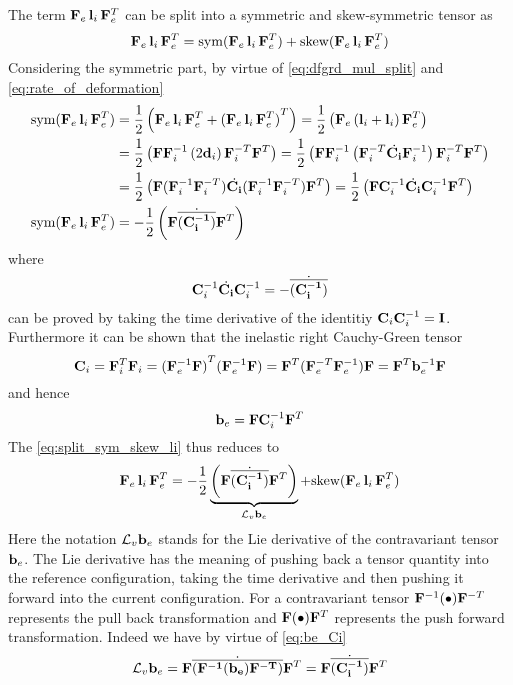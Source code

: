 The term \( \mathbf{F}_{e} \, \mathbf{l}_{i} \, \mathbf{F}_{e}^{T}\) can be split into a symmetric and skew-symmetric tensor as
\begin{equation}
    \mathbf{F}_{e} \, \mathbf{l}_{i} \, \mathbf{F}_{e}^{T} = \text{sym}(\mathbf{F}_{e} \, \mathbf{l}_{i} \, \mathbf{F}_{e}^{T}) + \text{skew}(\mathbf{F}_{e} \, \mathbf{l}_{i} \, \mathbf{F}_{e}^{T})
    \label{eq:split_sym_skew_li}
\end{equation}
Considering the symmetric part, by virtue of \cref{eq:dfgrd_mul_split} and \cref{eq:rate_of_deformation} 
\begin{align}
    \nonumber \text{sym} (\mathbf{F}_{e} \, \mathbf{l}_{i} \, \mathbf{F}_{e}^{T}) 
    &= \frac{1}{2} \left(\mathbf{F}_{e} \, \mathbf{l}_{i} \, \mathbf{F}_{e}^{T} + {(\mathbf{F}_{e} \, \mathbf{l}_{i} \, \mathbf{F}_{e}^{T})}^{T} \right)
    = \frac{1}{2} \left(\mathbf{F}_{e}  \left(\mathbf{l}_{i} + \mathbf{l}_{i}\right)  \mathbf{F}_{e}^{T} \right) \\
    \nonumber &= \frac{1}{2} \left(\mathbf{F} \mathbf{F}_{i}^{-1}  \left(2 \mathbf{d}_{i} \right)  \mathbf{F}_{i}^{-T} \mathbf{F}^{T} \right)
    = \frac{1}{2} \left(\mathbf{F} \mathbf{F}_{i}^{-1}  \left(\mathbf{F}_{i}^{-T} \dot{\mathbf{C}_{i}} \mathbf{F}_{i}^{-1} \right)  \mathbf{F}_{i}^{-T} \mathbf{F}^{T} \right) \\
    \nonumber&=  \frac{1}{2} \left(\mathbf{F} (\mathbf{F}_{i}^{-1}  \mathbf{F}_{i}^{-T}) \dot{\mathbf{C}_{i}} (\mathbf{F}_{i}^{-1} \mathbf{F}_{i}^{-T}) \mathbf{F}^{T} \right)= \frac{1}{2} \left(\mathbf{F} \mathbf{C}_{i}^{-1} \dot{\mathbf{C}_{i}} \mathbf{C}_{i}^{-1} \mathbf{F}^{T} \right)  \\
    \text{sym} (\mathbf{F}_{e} \, \mathbf{l}_{i} \, \mathbf{F}_{e}^{T}) 
    & = -\frac{1}{2} \left(\mathbf{F} \dot{\overline{(\mathbf{C}_{i}^{-1})}} \mathbf{F}^{T} \right)
\end{align}
where 
\begin{equation}
    \mathbf{C}_{i}^{-1} \dot{\mathbf{C}_{i}} \mathbf{C}_{i}^{-1} = - \dot{\overline{(\mathbf{C}_{i}^{-1})}}
\end{equation}
can be proved by taking the time derivative of the identitiy \(\mathbf{C}_{i} \mathbf{C}_{i}^{-1} = \mathbf{I}\). Furthermore it can be shown that the inelastic right Cauchy-Green tensor
\begin{equation}
    \mathbf{C}_{i} = \mathbf{F}_{i}^{T} \mathbf{F}_{i} 
    = {(\mathbf{F}_{e}^{-1} \mathbf{F})}^{T} (\mathbf{F}_{e}^{-1} \mathbf{F}) 
    = \mathbf{F}^{T} (\mathbf{F}_{e}^{-T} \mathbf{F}_{e}^{-1}) \mathbf{F}
    = \mathbf{F}^{T} \mathbf{b}_{e}^{-1} \mathbf{F}
    \label{eq:inelastic_right_cauchygreen}
\end{equation}
and hence
\begin{equation}
    \mathbf{b}_{e} = \mathbf{F} \mathbf{C}_{i}^{-1} \mathbf{F}^{T}
    \label{eq:be_Ci}
\end{equation}
The \cref{eq:split_sym_skew_li} thus reduces to 
\begin{equation}
    \mathbf{F}_{e} \, \mathbf{l}_{i} \, \mathbf{F}_{e}^{T} = -\frac{1}{2} \underbrace{\left(\mathbf{F} \dot{\overline{(\mathbf{C}_{i}^{-1})}} \mathbf{F}^{T} \right)}_{\mathcal{L}_{v} \mathbf{b}_{e} } + \text{skew}(\mathbf{F}_{e} \, \mathbf{l}_{i} \, \mathbf{F}_{e}^{T})
\end{equation}
Here the notation \(\mathcal{L}_{v} \mathbf{b}_{e} \) stands for the Lie derivative of the contravariant tensor \(\mathbf{b}_{e} \). The Lie derivative has the meaning of pushing back a tensor quantity into the reference configuration, taking the time derivative and then pushing it forward into the current configuration. For a contravariant tensor \(\mathbf{F}^{-1} (\bullet) \mathbf{F}^{-T} \) represents the pull back transformation and \(\mathbf{F} (\bullet) \mathbf{F}^{T} \) represents the push forward transformation. Indeed we have by virtue of \cref{eq:be_Ci}
\begin{equation}
    \mathcal{L}_{v} \mathbf{b}_{e} 
    = \mathbf{F} \dot{\overline{(\mathbf{F}^{-1} (\mathbf{b}_{e}) \mathbf{F}^{-T})}} \mathbf{F}^{T}
    = \mathbf{F} \dot{\overline{(\mathbf{C}_{i}^{-1})}} \mathbf{F}^{T}
\end{equation} 

